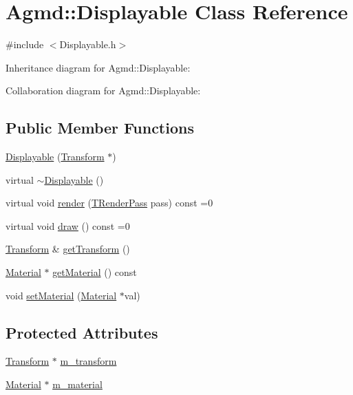 \hypertarget{class_agmd_1_1_displayable}{\section{Agmd\+:\+:Displayable Class Reference}
\label{class_agmd_1_1_displayable}
}


{\ttfamily \#include $<$Displayable.\+h$>$}



Inheritance diagram for Agmd\+:\+:Displayable\+:


Collaboration diagram for Agmd\+:\+:Displayable\+:
\subsection*{Public Member Functions}
\begin{DoxyCompactItemize}
\item 
\hyperlink{class_agmd_1_1_displayable_af2c5d12af29a875226963ab4b8d76d9e}{Displayable} (\hyperlink{class_agmd_maths_1_1_transform}{Transform} $\ast$)
\item 
virtual \hyperlink{class_agmd_1_1_displayable_a18780095e5b049d3a3d43a748a541605}{$\sim$\+Displayable} ()
\item 
virtual void \hyperlink{class_agmd_1_1_displayable_acf6e45b6cf747a2dd6a8ca7ebf6805fe}{render} (\hyperlink{namespace_agmd_a893087981df53d0bf39466e9039aeb73}{T\+Render\+Pass} pass) const =0
\item 
virtual void \hyperlink{class_agmd_1_1_displayable_aa6bd5ead2497fe7dfee8c110219dc9a2}{draw} () const =0
\item 
\hyperlink{class_agmd_maths_1_1_transform}{Transform} \& \hyperlink{class_agmd_1_1_displayable_a7d447fca5a01a63dbe5ae969ca40a8bd}{get\+Transform} ()
\item 
\hyperlink{class_agmd_1_1_material}{Material} $\ast$ \hyperlink{class_agmd_1_1_displayable_a01f9693c7fdae204d745fadb43bb2dbe}{get\+Material} () const 
\item 
void \hyperlink{class_agmd_1_1_displayable_a2b950738ad797c55b82406e794546d90}{set\+Material} (\hyperlink{class_agmd_1_1_material}{Material} $\ast$val)
\end{DoxyCompactItemize}
\subsection*{Protected Attributes}
\begin{DoxyCompactItemize}
\item 
\hyperlink{class_agmd_maths_1_1_transform}{Transform} $\ast$ \hyperlink{class_agmd_1_1_displayable_a7d97ac7c8eb5339dc1fa41222a2fb14c}{m\+\_\+transform}
\item 
\hyperlink{class_agmd_1_1_material}{Material} $\ast$ \hyperlink{class_agmd_1_1_displayable_a44445692b08ae4e9bd9dae50466444c5}{m\+\_\+material}
\end{DoxyCompactItemize}


